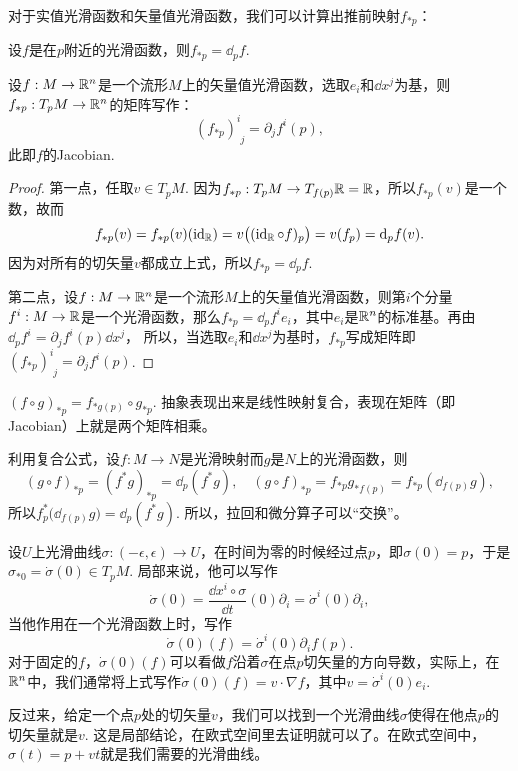 \begin{pro}对于实值光滑函数和矢量值光滑函数，我们可以计算出推前映射$f_{*p}$：
\begin{compactenum}
\item 设$f$是在$p$附近的光滑函数，则$f_{*p}=\dd_p f$. 
\item 设$f:M\to \mathbb{R}^n$是一个流形$M$上的矢量值光滑函数，选取$e_i$和$\dd x^j$为基，则$f_{*p}:T_pM\to \mathbb{R}^n$的矩阵写作：
\[
	(f_{*p})^{i}_{\phantom{i}j}=\partial_j f^i(p),
\]
此即$f$的Jacobian.
\end{compactenum}
\end{pro}

\begin{proof}
第一点，任取$v\in T_pM$. 因为$f_{*p}:T_pM\to T_{f(p)}\mathbb{R}=\mathbb{R}$，所以$f_{*p}(v)$是一个数，故而
\[
	f_{*p}(v)=f_{*p}(v)(\operatorname{id}_{\mathbb{R}})=v\bigl((\operatorname{id}_{\mathbb{R}}\circ f)_p\bigr)=v(f_p)=\mathrm{d}_p f(v).
\]
因为对所有的切矢量$v$都成立上式，所以$f_{*p}=\dd_p f$.

第二点，设$f:M\to \mathbb{R}^n$是一个流形$M$上的矢量值光滑函数，则第$i$个分量$f^i:M\to \mathbb{R}$是一个光滑函数，那么$f_{*p}=\dd_pf^i e_i$，其中$e_i$是$\mathbb{R}^n$的标准基。再由
$\dd_pf^i=\partial_j f^i(p) \dd x^j$，
所以，当选取$e_i$和$\dd x^j$为基时，$f_{*p}$写成矩阵即$(f_{*p})^{i}_{\phantom{i}j}=\partial_j f^i(p)$.
\end{proof}

\begin{para}[复合函数求导法则]
$(f\circ g)_{*p}=f_{*g(p)}\circ g_{*p}$. 抽象表现出来是线性映射复合，表现在矩阵（即Jacobian）上就是两个矩阵相乘。
\end{para}

\begin{para}\label{f*d=df*}
利用复合公式，设$f:M\to N$是光滑映射而$g$是$N$上的光滑函数，则
\[
	(g\circ f)_{*p}=(f^*g)_{*p}=\dd_p(f^*g),\quad (g\circ f)_{*p}=f_{*p}g_{*f(p)}=f_{*p}\left(\dd_{f(p)}g \right),
\]
所以$f^*_p\bigl(\dd_{f(p)}g\bigr)=\dd_{p}(f^*g)$. 所以，拉回和微分算子可以“交换”。
\end{para}

\begin{para}[曲线的切矢量]
设$U$上光滑曲线$\sigma:(-\epsilon,\epsilon)\to U$，在时间为零的时候经过点$p$，即$\sigma(0)=p$，于是$\sigma_{*0}=\dot\sigma(0)\in T_pM$. 局部来说，他可以写作
\[
	\dot{\sigma}(0)=\frac{\dd x^i\circ \sigma}{\dd t}(0)\partial_i=\dot \sigma^i(0)\partial_i,
\]
当他作用在一个光滑函数上时，写作
\[
	\dot{\sigma}(0)(f)=\dot \sigma^i(0)\partial_if(p).
\]
对于固定的$f$，$\dot{\sigma}(0)(f)$可以看做$f$沿着$\sigma$在点$p$切矢量的方向导数，实际上，在$\mathbb{R}^n$中，我们通常将上式写作$\dot{\sigma}(0)(f)=v\cdot \nabla f$，其中$v=\dot \sigma^i(0)e_i$.

反过来，给定一个点$p$处的切矢量$v$，我们可以找到一个光滑曲线$\sigma$使得在他点$p$的切矢量就是$v$. 这是局部结论，在欧式空间里去证明就可以了。在欧式空间中，$\sigma(t)=p+vt$就是我们需要的光滑曲线。
\end{para}

